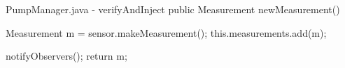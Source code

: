 \begin{javaCode} {PumpManager.java - verifyAndInject}
public Measurement newMeasurement() {
    Measurement m = sensor.makeMeasurement();
    this.measurements.add(m);

    notifyObservers();
    return m;
}
\end{javaCode}